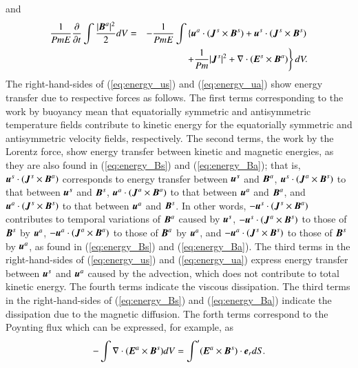 %
and 
%
\begin{eqnarray}
\displaystyle
\frac{1}{Pm E}\frac{\partial}{\partial t}
 \int \frac{|\mbox{\boldmath$B$}^a|^2}{2} d V 
& = & \displaystyle
- \frac{1}{Pm E}\int \left\{
      \mbox{\boldmath$u$}^a \cdot 
          ( \mbox{\boldmath$J$}^s \times \mbox{\boldmath$B$}^s )
    + \mbox{\boldmath$u$}^s \cdot 
          ( \mbox{\boldmath$J$}^s \times \mbox{\boldmath$B$}^s )
    \right.
\nonumber \\
\hspace{3em}
 & & \displaystyle
    \left.
    + \frac{1}{Pm} |\mbox{\boldmath$J$}^s|^2
    + \nabla \cdot ( \mbox{\boldmath$E$}^s \times \mbox{\boldmath$B$}^a ) 
      \right\} d V.
\label{eq:energy_Ba}
\end{eqnarray}
%
The right-hand-sides of (\ref{eq:energy_us}) and (\ref{eq:energy_ua}) show energy transfer due to respective forces {\color{red} as follows}.
The first terms corresponding to the work by buoyancy mean that equatorially symmetric and antisymmetric temperature fields contribute to kinetic energy for the equatorially symmetric and antisymmetric velocity fields, respectively.
The second terms, the work by the Lorentz force, show energy transfer between kinetic and magnetic energies, as they are also found in (\ref{eq:energy_Bs}) and (\ref{eq:energy_Ba}); that is, $\mbox{\boldmath$u$}^s \cdot (\mbox{\boldmath$J$}^s \times \mbox{\boldmath$B$}^a)$ corresponds to energy transfer between $\mbox{\boldmath$u$}^s$ and $\mbox{\boldmath$B$}^a$, $\mbox{\boldmath$u$}^s \cdot (\mbox{\boldmath$J$}^a \times \mbox{\boldmath$B$}^s)$ to that between $\mbox{\boldmath$u$}^s$ and $\mbox{\boldmath$B$}^s$, $\mbox{\boldmath$u$}^a \cdot (\mbox{\boldmath$J$}^a \times \mbox{\boldmath$B$}^a)$ to that between $\mbox{\boldmath$u$}^a$ and $\mbox{\boldmath$B$}^a$, and $\mbox{\boldmath$u$}^a \cdot (\mbox{\boldmath$J$}^s \times \mbox{\boldmath$B$}^s)$ to that between $\mbox{\boldmath$u$}^a$ and $\mbox{\boldmath$B$}^s$.
In other words, $-\mbox{\boldmath$u$}^s \cdot (\mbox{\boldmath$J$}^s \times \mbox{\boldmath$B$}^a)$ contributes to temporal variations of $\mbox{\boldmath$B$}^a$ caused by $\mbox{\boldmath$u$}^s$, $-\mbox{\boldmath$u$}^s \cdot (\mbox{\boldmath$J$}^a \times \mbox{\boldmath$B$}^s)$ to those of $\mbox{\boldmath$B$}^s$ by $\mbox{\boldmath$u$}^a$, $-\mbox{\boldmath$u$}^a \cdot (\mbox{\boldmath$J$}^a \times \mbox{\boldmath$B$}^a)$ to those of $\mbox{\boldmath$B$}^a$ by $\mbox{\boldmath$u$}^a$, and $-\mbox{\boldmath$u$}^a \cdot (\mbox{\boldmath$J$}^s \times \mbox{\boldmath$B$}^s)$ to those of $\mbox{\boldmath$B$}^s$ by $\mbox{\boldmath$u$}^a$, as found in (\ref{eq:energy_Bs}) and (\ref{eq:energy_Ba}).
The third terms in the right-hand-sides of (\ref{eq:energy_us}) and (\ref{eq:energy_ua}) express energy transfer between $\mbox{\boldmath$u$}^s$ and $\mbox{\boldmath$u$}^a$ caused by the advection, which does not contribute to total kinetic energy.
The fourth terms indicate the {\color{red} viscous} dissipation. 
The third terms in the right-hand-sides of (\ref{eq:energy_Bs}) and (\ref{eq:energy_Ba}) indicate the dissipation due to the magnetic diffusion.
The forth terms correspond to the Poynting flux which can be expressed, for example, as
%
\begin{equation}
-\int \nabla \cdot
  ( \mbox{\boldmath$E$}^a \times \mbox{\boldmath$B$}^s ) d V =
 \int ' (\mbox{\boldmath$E$}^a \times \mbox{\boldmath$B$}^s )
   \cdot \mbox{\boldmath$e$}_r d S .
\label{eq:Poynting}
\end{equation}
%


